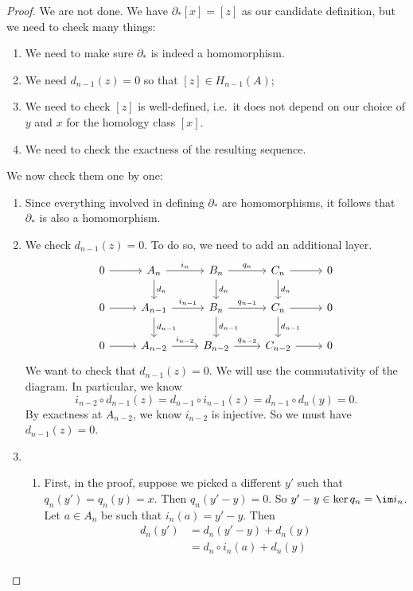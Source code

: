 \documentclass[a4paper]{article}
\theoremstyle{definition}
\begin{document}
\begin{proof}
  We are not done. We have $\partial_* [x] = [z]$ as our candidate definition, but we need to check many things:
  \begin{enumerate}
    \item We need to make sure $\partial_*$ is indeed a homomorphism.
    \item We need $d_{n - 1}(z) = 0$ so that $[z] \in H_{n - 1}(A)$;
    \item We need to check $[z]$ is well-defined, i.e.\ it does not depend on our choice of $y$ and $x$ for the homology class $[x]$.
    \item We need to check the exactness of the resulting sequence.
  \end{enumerate}
  We now check them one by one:
  \begin{enumerate}
    \item Since everything involved in defining $\partial_*$ are homomorphisms, it follows that $\partial_*$ is also a homomorphism.
    \item We check $d_{n - 1}(z) = 0$. To do so, we need to add an additional layer.
      \[
        \begin{tikzcd}
          0 \ar[r] & A_n \ar[r, "i_n"] \ar[d, "d_n"] & B_n \ar[r, "q_n"] \ar[d, "d_n"] & C_n \ar[r] \ar[d, "d_n"] & 0\\
          0 \ar[r] & A_{n - 1} \ar[r, "i_{n - 1}"] \ar[d, "d_{n - 1}"] & B_n \ar[r, "q_{n - 1}"] \ar[d, "d_{n - 1}"] & C_n \ar[r] \ar[d, "d_{n - 1}"] & 0\\
          0 \ar[r] & A_{n - 2} \ar[r, "i_{n - 2}"] & B_{n - 2} \ar[r, "q_{n - 2}"] & C_{n - 2} \ar[r] & 0
        \end{tikzcd}
      \]
      We want to check that $d_{n - 1}(z) = 0$. We will use the commutativity of the diagram. In particular, we know
      \[
        i_{n - 2} \circ d_{n - 1}(z) = d_{n - 1} \circ i_{n - 1} (z) = d_{n - 1} \circ d_n(y) = 0.
      \]
      By exactness at $A_{n - 2}$, we know $i_{n - 2}$ is injective. So we must have $d_{n - 1}(z) = 0$.
    \item
      \begin{enumerate}
        \item First, in the proof, suppose we picked a different $y'$ such that $q_n(y') = q_n(y) = x$. Then $q_n(y' - y) = 0$. So $y' - y \in \ker q_n = \im i_n$. Let $a \in A_n$ be such that $i_n(a) = y' - y$. Then
          \begin{align*}
            d_n(y') &= d_n(y' - y) + d_n(y) \\
            &= d_n \circ i_n (a) + d_n(y) \\

\end{align*}
\end{enumerate}
\end{enumerate}
\end{proof}
\end{document}
